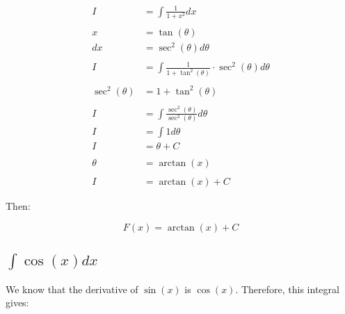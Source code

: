 \documentclass[12pt]{article}
\begin{document}
\begin{align}
    I              & = \int \frac{1}{1 + x^2} dx                                      \\
    \nonumber                                                                         \\
    x              & = \tan(\theta)                                                   \\
    dx             & = \sec^2(\theta) d\theta                                         \\
    \nonumber                                                                         \\
    I              & = \int \frac{1}{1 + \tan^2(\theta)} \cdot \sec^2(\theta) d\theta \\
    \nonumber                                                                         \\
    \sec^2(\theta) & = 1 + \tan^2(\theta)                                             \\
    \nonumber                                                                         \\
    I              & = \int \frac{\sec^2(\theta)}{\sec^2(\theta)} d\theta             \\
    I              & = \int 1 d\theta                                                 \\
    I              & = \theta + C                                                     \\
    \nonumber                                                                         \\
    \theta         & = \arctan(x)                                                     \\
    \nonumber                                                                         \\
    I              & = \arctan(x) + C
\end{align}

Then:

$$
    F(x) = \arctan(x) + C
$$

\subsection{$\int \cos(x) dx$}

We know that the derivative of $\sin(x)$ is $\cos(x)$. Therefore, this integral gives:
\end{document}
